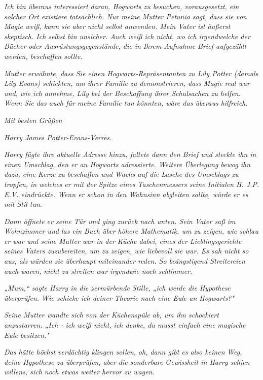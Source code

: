 {\emph{Ich bin überaus interessiert daran, Hogwarts zu besuchen, vorausgesetzt, ein solcher Ort existiere tatsächlich. Nur meine Mutter Petunia sagt, dass sie von Magie weiß, kann sie aber nicht selbst anwenden. Mein Vater ist äußerst skeptisch. Ich selbst bin unsicher. Auch weiß ich nicht, wo ich irgendwelche der Bücher oder Ausrüstungsgegenstände, die in Ihrem Aufnahme-Brief aufgezählt werden, beschaffen sollte.}

\emph{Mutter erwähnte, dass Sie einen Hogwarts-Repräsentanten zu Lily Potter (damals Lily Evans) schickten, um ihrer Familie zu demonstrieren, dass Magie real war und, wie ich annehme, Lily bei der Beschaffung ihrer Schulsachen zu helfen. Wenn Sie das auch für meine Familie tun könnten, wäre das überaus hilfreich.}

\emph{Mit besten Grüßen}

\emph{Harry James Potter-Evans-Verres.}

\emph{Harry fügte ihre aktuelle Adresse hinzu, faltete dann den Brief und steckte ihn in einen Umschlag, den er an Hogwarts adressierte. Weitere Überlegung bewog ihn dazu, eine Kerze zu beschaffen und Wachs auf die Lasche des Umschlags zu tropfen, in welches er mit der Spitze eines Taschenmessers seine Initialen H. J.P. E.V. eindrückte. Wenn er schon in den Wahnsinn abgleiten sollte, würde er es mit Stil tun.}

\emph{Dann öffnete er seine Tür und ging zurück nach unten. Sein Vater saß im Wohnzimmer und las ein Buch über höhere Mathematik, um zu zeigen, wie schlau er war und seine Mutter war in der Küche dabei, eines der Lieblingsgerichte seines Vaters zuzubereiten, um zu zeigen, wie liebevoll sie war. Es sah nicht so aus, als würden sie überhaupt miteinander reden. So beängstigend Streitereien auch waren,} \emph{\emph{nicht zu streiten}} \emph{war irgendwie noch schlimmer.}

\emph{„Mum,“ sagte Harry in die zermürbende Stille, „ich werde die Hypothese überprüfen. Wie schicke ich deiner Theorie nach eine Eule an Hogwarts?"}

\emph{Seine Mutter wandte sich von der Küchenspüle ab, um ihn schockiert anzustarren. „Ich - ich weiß nicht, ich denke, du musst einfach eine} \emph{magische Eule besitzen."}

\emph{Das hätte höchst verdächtig klingen sollen,} \emph{\emph{oh, dann gibt es also keinen}} \emph{\emph{Weg, deine Hypothese zu überprüfen,}} \emph{aber die sonderbare Gewissheit in Harry schien willens, sich noch etwas weiter hervor zu wagen.}

}
